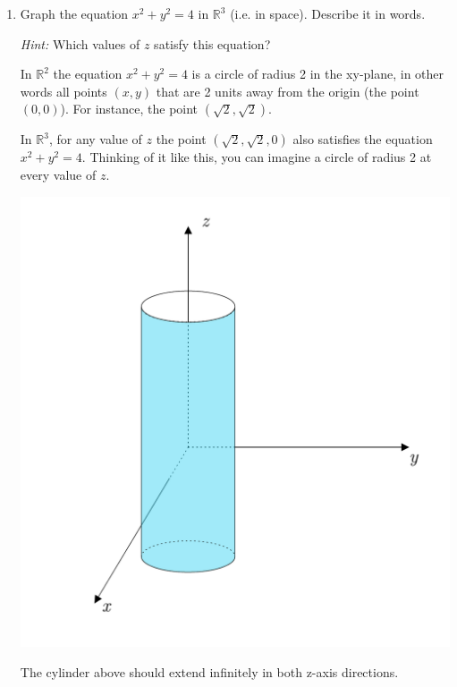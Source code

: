 \documentclass[12pt]{exam}
\newcommand{\R}{\mathbb{R}}
\begin{document}
\begin{enumerate}
{\begin{enumerate}
\begin{solution}
\begin{center}
\begin{tikzpicture}
          \end{tikzpicture}
          \end{center}
          A circle of radius 2 centered at the origin
        \end{solution}
        \item
        {
          Graph the equation $x^{2}+y^{2}=4$ in $\mathbb{R}^{3}$ (i.e. in space).
          Describe it in words.
      
          \textit{Hint:}
          Which values of $z$ satisfy this equation?
        }

          \begin{solution}
            In \(\R^2\) the equation \(x^2+y^2=4\) is a circle of radius 2 in the xy-plane, in other words all points \((x,y)\) that are 2 units away from the origin (the point \((0,0)\)). For instance, the point \((\sqrt{2},\sqrt{2})\).

            In \(\R^3\), for any value of \(z\) the point \((\sqrt{2},\sqrt{2},0)\) also satisfies the equation \(x^2+y^2=4\). Thinking of it like this, you can imagine a circle of radius 2 at every value of \(z\).
            \begin{center}
              \includegraphics[width=.6\textwidth]{12-1-tube.pdf}
            \end{center}
            The cylinder above should extend infinitely in both z-axis directions.
          \end{solution}


\end{enumerate}}
\end{enumerate}
\end{document}
